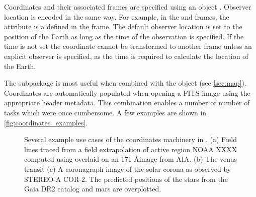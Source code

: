 Coordinates and their associated frames are specified using an \astropy {} object \citep[see Section 3.3 of][]{astropy2018}.
Observer location is encoded in the same way.
For example, in the \hpc and \hcc frames, the  attribute is a  defined in the \hgs frame.
The default observer location is set to the position of the Earth as long as the time of the observation is specified.
If the time is not set the coordinate cannot be transformed to another frame unless an explicit observer is specified, as the time is required to calculate the location of the Earth.

The  subpackage is most useful when combined with the  object (see \autoref{sec:map}).
Coordinates are automatically populated when opening a FITS image using the appropriate header metadata.
This combination enables a number of number of tasks which were once cumbersome.
A few examples are shown in \autoref{fig:coordinates_examples}.


\begin{figure}
    \caption{Several example use cases of the coordinates machinery in \sunpy.
    (a) Field lines traced from a field extrapolation of active region NOAA XXXX computed using  overlaid on an 171 \AA image from AIA.
    (b) The venus transit
    (c) A coronagraph image of the solar corona as observed by STEREO-A COR-2. The predicted positions of the stars from the Gaia DR2 catalog and mars are overplotted.}
    \label{fig:coordinates_examples}
\end{figure}




